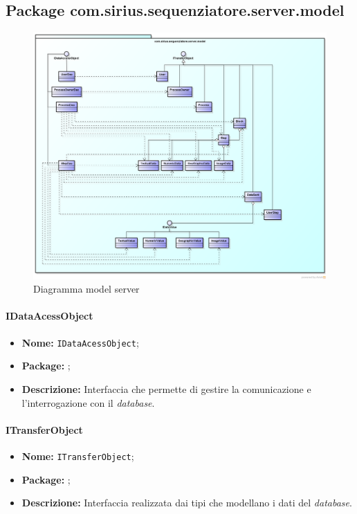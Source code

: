 \subsection{Package com.sirius.sequenziatore.server.model}
\begin{figure}[H] \centering \includegraphics[width=%
\textwidth]
{./pack/ClassiServerSoloModel.png} \caption{Diagramma model server}
\end{figure}

\paragraph{IDataAcessObject}
\begin{itemize}
\item \textbf{Nome:} \texttt{IDataAcessObject};
\item \textbf{Package:} \texttt{\smodel{}};
\item \textbf{Descrizione:} Interfaccia che permette di gestire la comunicazione e l'interrogazione con il \textit{database}.
\end{itemize}

\paragraph{ITransferObject}
\begin{itemize}
\item \textbf{Nome:} \texttt{ITransferObject};
\item \textbf{Package:} \texttt{\smodel{}};
\item \textbf{Descrizione:} Interfaccia realizzata dai tipi che modellano i dati del \textit{database}.
\end{itemize}

